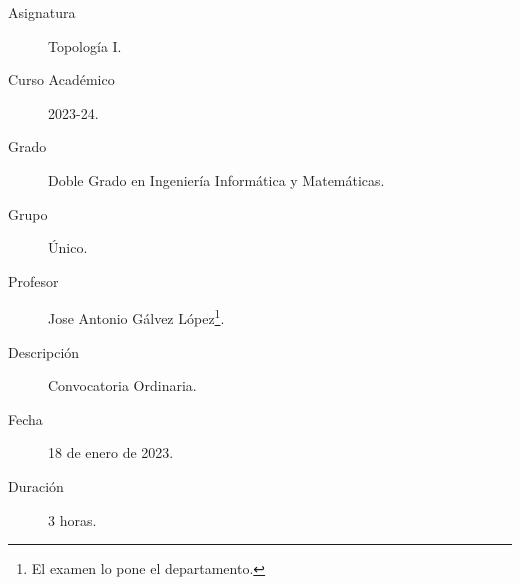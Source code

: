\documentclass[12pt]{article}
\begin{document}

    
    

    \begin{description}
        \item[Asignatura] Topología I.
        \item[Curso Académico] 2023-24.
        \item[Grado] Doble Grado en Ingeniería Informática y Matemáticas.
        \item[Grupo] Único.
        \item[Profesor] Jose Antonio Gálvez López\footnote{El examen lo pone el departamento.}.
        \item[Descripción] Convocatoria Ordinaria.
        \item[Fecha] 18 de enero de 2023.
        \item[Duración] 3 horas.
    
    \end{description}
    \newpage
    
\end{document}
